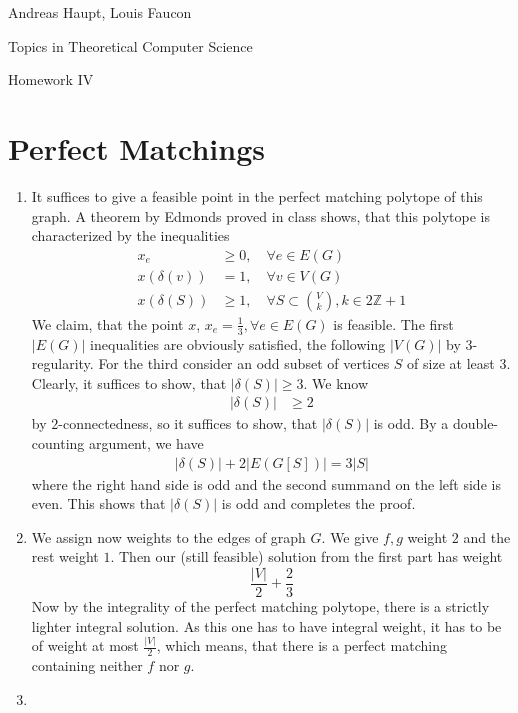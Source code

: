 \documentclass{scrartcl}
\begin{document}
Andreas Haupt, Louis Faucon

Topics in Theoretical Computer Science 

Homework IV


\section{Perfect Matchings}\label{sec:perfectmatch}
\begin{enumerate}
\item
It suffices to give a feasible point in the perfect matching polytope of this graph. A theorem by Edmonds proved in class shows, that this polytope is characterized by the inequalities
\begin{align*}
x_e &\ge 0 , \quad \forall e \in E (G) \\
x(\delta (v)) &=1, \quad \forall v \in V(G) \\
x (\delta (S)) &\ge 1, \quad \forall S \subset \binom{V}{k}, k \in 2\mathbb{Z}+1
\end{align*}
We claim, that the point $x$, $x_e = \frac{1}{3}, \forall e \in E(G)$ is feasible. The first $\lvert E(G)\rvert$ inequalities are obviously satisfied, the following $\lvert V(G)\rvert$ by $3$-regularity. For the third consider an odd subset of vertices $S$ of size at least $3$. Clearly, it suffices to show, that $\lvert \delta (S) \rvert \ge 3$. We know
\begin{align*}
\lvert\delta (S)\rvert &\ge 2
\end{align*}
by $2$-connectedness, so it suffices to show, that $\lvert \delta (S) \rvert$ is odd. By a double-counting argument, we have
\begin{align*}
\lvert \delta (S) \rvert + 2\lvert E(G[S])\rvert = 3 \lvert S \rvert
\end{align*}
where the right hand side is odd and the second summand on the left side is even. This shows that $\lvert \delta (S) \rvert$ is odd and completes the proof.
\item
We assign now weights to the edges of graph $G$. We give $f,g$ weight $2$ and the rest weight $1$. Then our (still feasible) solution from the first part has weight
\[
\frac{\lvert V\rvert}{2} + \frac{2}{3}
\]
Now by the integrality of the perfect matching polytope, there is a strictly lighter integral solution. As this one has to have integral weight, it has to be of weight at most $\frac{\lvert V \rvert}{2}$, which means, that there is a perfect matching containing neither $f$ nor $g$.
\item \label{enum:bridge}

\end{enumerate}
\end{document}
